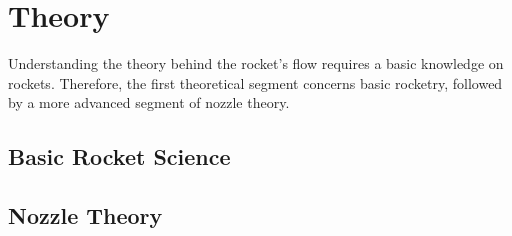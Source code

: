 \chapter{Theory}

Understanding the theory behind the rocket's flow requires a basic knowledge on rockets. Therefore, the first theoretical segment concerns basic rocketry, followed by a more advanced segment of nozzle theory.

\section{Basic Rocket Science}
\section{Nozzle Theory}
